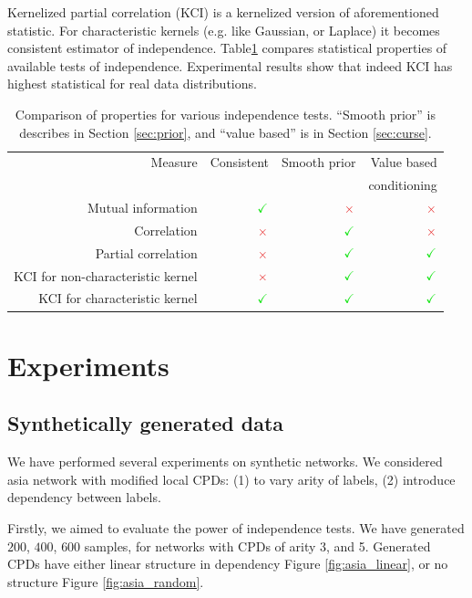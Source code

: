 \documentclass{article} %
\begin{document}
Kernelized partial correlation (KCI) \cite{zhang2012kernel} is a kernelized version of aforementioned statistic. 
For characteristic kernels (e.g. like Gaussian, or Laplace) it becomes consistent estimator of
independence. Table\ref{tab:compar} compares statistical properties of available tests of independence.
Experimental results show that indeed KCI has highest statistical for real data distributions.


\begin{table}[t]
\centering
\tiny
\begin{tabular}{rrrr}
\hline
Measure & Consistent & Smooth prior& Value based\\
& & & conditioning\\
\hline
Mutual information & $\color{LimeGreen} \checkmark $ & $\color{Maroon}\times$ & $\color{Maroon}\times$ \\
Correlation & $\color{Maroon}\times$  & $\color{LimeGreen} \checkmark $ & $\color{Maroon}\times$ \\
Partial correlation & $\color{Maroon}\times$  & $\color{LimeGreen} \checkmark $ & $\color{LimeGreen}\checkmark$ \\
KCI for non-characteristic kernel & $\color{Maroon}\times$  & $\color{LimeGreen} \checkmark $ & $\color{LimeGreen}\checkmark$ \\
KCI for characteristic kernel & $\color{LimeGreen}\checkmark$  & $\color{LimeGreen} \checkmark $ & $\color{LimeGreen}\checkmark$ \\
\hline
\end{tabular}
\caption{Comparison of properties for various independence tests. ``Smooth prior'' is describes in Section \ref{sec:prior}, 
and ``value based'' is in Section \ref{sec:curse}.}
\label{tab:compar}
\end{table}


\section{Experiments}


\subsection{Synthetically generated data}
We have performed several experiments on synthetic networks. We considered asia network
with modified local CPDs: (1) to vary arity of labels, (2) introduce dependency between labels.


Firstly, we aimed to evaluate the power of independence tests. We have generated $200$, $400$, $600$
samples, for networks with CPDs of arity 3, and 5. Generated CPDs 
have either linear structure in dependency Figure \ref{fig:asia_linear}, or no structure Figure \ref{fig:asia_random}.
\end{document}

